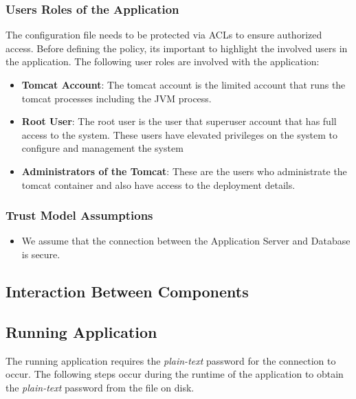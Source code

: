 \documentclass[11pt, a4paper, notitlepage]{article}
\begin{document}
\subsubsection*{Users Roles of the Application}
The configuration file needs to be protected via ACLs to ensure authorized access. Before defining the policy, its important to highlight the involved users in the application. The following user roles are involved with the application:
\begin{itemize}
\item \textbf{Tomcat Account}: The tomcat account is the limited account that runs the tomcat processes including the JVM process. 
\item \textbf{Root User}: The root user is the user that superuser account that has full access to the system. These users have elevated privileges on the system to configure and management the system
\item \textbf{Administrators of the Tomcat}: These are the users who administrate the tomcat container and also have access to the deployment details.
\end{itemize}

\subsubsection*{Trust Model Assumptions}
\begin{itemize}
\item We assume that the connection between the Application Server and Database is secure.
\end{itemize}

\subsection*{Interaction Between Components}
\subsection*{Running Application}
The running application requires the \emph{plain-text} password for the connection to occur. The following steps occur during the runtime of the application to obtain the \emph{plain-text} password from the file on disk. 
\end{document}
